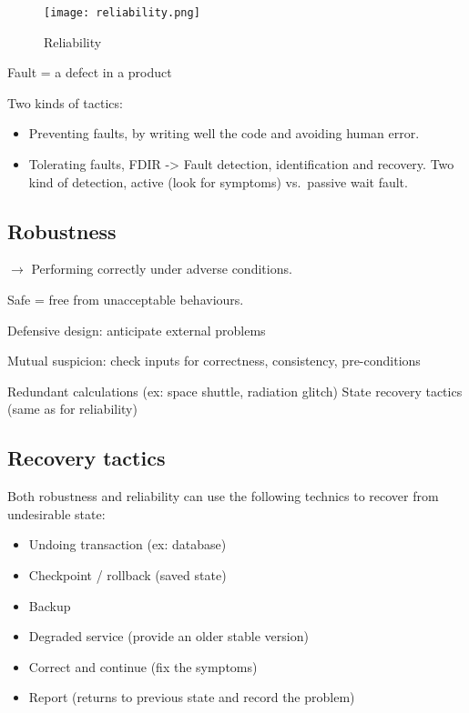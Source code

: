 \begin{figure}[!ht]
    \centering
    \texttt{[image: reliability.png]}
    \caption{Reliability}
\end{figure}

Fault = a defect in a product

Two kinds of tactics:

\begin{itemize}
    \item Preventing faults, by writing well the code and avoiding human error.
    \item Tolerating faults, FDIR -> Fault detection, identification and recovery. Two kind of detection, active (look for symptoms) vs.\ passive wait fault.
\end{itemize}

\subsection{Robustness}

$\rightarrow$ Performing correctly under adverse conditions.

Safe = free from unacceptable behaviours.

Defensive design: anticipate external problems

Mutual suspicion: check inputs for correctness, consistency, pre-conditions

Redundant calculations (ex: space shuttle, radiation glitch)
State recovery tactics (same as for reliability)

\subsection{Recovery tactics}

Both robustness and reliability can use the following technics to recover from undesirable
state:

\begin{itemize}
    \item Undoing transaction (ex: database)
    \item Checkpoint / rollback (saved state)
    \item Backup
    \item Degraded service (provide an older stable version)
    \item Correct and continue (fix the symptoms)
    \item Report (returns to previous state and record the problem)
\end{itemize}

